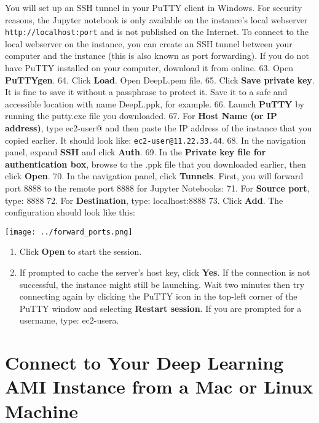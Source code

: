 \documentclass[]{book}
\providecommand{\tightlist}{%
  \setlength{\itemsep}{0pt}\setlength{\parskip}{0pt}}
\begin{document}
You will set up an SSH tunnel in your PuTTY client in Windows. For security reasons, the Jupyter notebook is only available on the instance's local webserver \texttt{http://localhost:port} and is not published on the Internet. To connect to the local webserver on the instance, you can create an SSH tunnel between your computer and the instance (this is also known as port forwarding). If you do not have PuTTY installed on your computer, download it from online.
63. Open \textbf{PuTTYgen}.
64. Click \textbf{Load}. Open DeepL.pem file.
65. Click \textbf{Save private key}. It is fine to save it without a passphrase to protect it. Save it to a safe and accessible location with name DeepL.ppk, for example.
66. Launch \textbf{PuTTY} by running the putty.exe file you downloaded.
67. For \textbf{Host Name (or IP address)}, type ec2-user@ and then paste the IP address of the instance that you copied earlier. It should look like: \texttt{ec2-user@11.22.33.44}.
68. In the navigation panel, expand \textbf{SSH} and click \textbf{Auth}.
69. In the \textbf{Private key file for authentication box}, browse to the .ppk file that you downloaded earlier, then click \textbf{Open}.
70. In the navigation panel, click \textbf{Tunnels}.
First, you will forward port 8888 to the remote port 8888 for Jupyter Notebooks:
71. For \textbf{Source port}, type: 8888
72. For \textbf{Destination}, type: localhost:8888
73. Click \textbf{Add}.
The configuration should look like this:

\texttt{[image: ../forward\_ports.png]}

\begin{enumerate}
\def\labelenumi{\arabic{enumi}.}
\setcounter{enumi}{73}
\tightlist
\item
  Click \textbf{Open} to start the session.
\item
  If prompted to cache the server's host key, click \textbf{Yes}. If the connection is not successful, the instance might still be launching. Wait two minutes then try connecting again by clicking the PuTTY icon in the top-left corner of the PuTTY window and selecting \textbf{Restart session}. If you are prompted for a username, type: ec2-usera.
\end{enumerate}

\hypertarget{connect-to-your-deep-learning-ami-instance-from-a-mac-or-linux-machine}{%
\section{Connect to Your Deep Learning AMI Instance from a Mac or Linux Machine}\label{connect-to-your-deep-learning-ami-instance-from-a-mac-or-linux-machine}}
\end{document}
